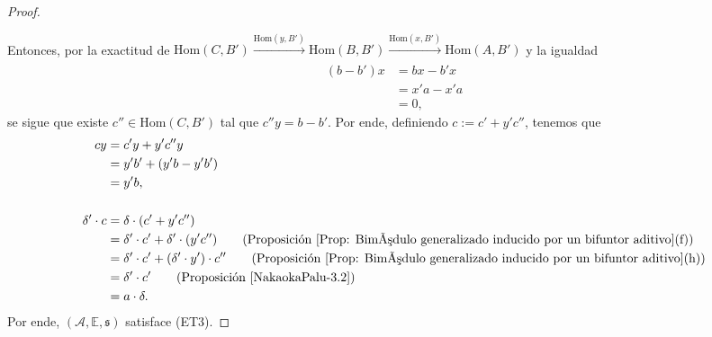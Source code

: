 \documentclass[tesis]{subfiles}
\begin{document}
\begin{proof}
    \begin{center}
    \end{center}
    Entonces, por la exactitud de $\text{Hom}(C,B')\xrightarrow[]{\text{Hom}(y,B')} \text{Hom}(B,B')\xrightarrow[]{\text{Hom}(x,B')} \text{Hom}(A,B')$ y la igualdad
    \begin{align*}
        (b-b')x &= bx - b'x \\
                &= x'a - x'a \\
                &= 0,
    \end{align*}
    se sigue que existe $c''\in\text{Hom}(C,B')$ tal que $c''y = b-b'$. Por ende, definiendo $c:= c'+y'c''$, tenemos que
    \begin{align*}
        cy &= c'y + y'c''y \\
           &= y'b' + (y'b-y'b') \\
           &= y'b, \\ \\
        \delta'\cdot c &= \delta\cdot(c' + y'c'') \\
                       &= \delta'\cdot c' + \delta'\cdot(y'c'') \tag{Proposición \ref{Prop: Bimódulo generalizado inducido por un bifuntor aditivo}(f)} \\
                       &= \delta'\cdot c' + (\delta'\cdot y')\cdot c'' \tag{Proposición \ref{Prop: Bimódulo generalizado inducido por un bifuntor aditivo}(h)} \\
                       &= \delta'\cdot c' \tag{Proposición \ref{NakaokaPalu-3.2}} \\
                       &= a\cdot\delta.
    \end{align*}
    Por ende, $(\mathscr{A},\mathbb{E},\mathfrak{s})$ satisface (ET3).
\end{proof}
\end{document}
